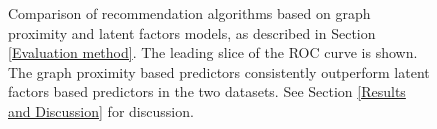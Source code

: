 \documentclass{sig-alternate}
\begin{document}
\begin{figure}[h]
  \begin{center}
  \end{center}
  \caption{Comparison of recommendation algorithms based on graph proximity and latent factors models, as described in Section \ref{Evaluation method}. The leading slice of the ROC curve is shown. The graph proximity based predictors consistently outperform latent factors based predictors in the two datasets. See Section \ref{Results and Discussion} for discussion.}
  \label{fig:summaryResults}
\end{figure}
\end{document}
